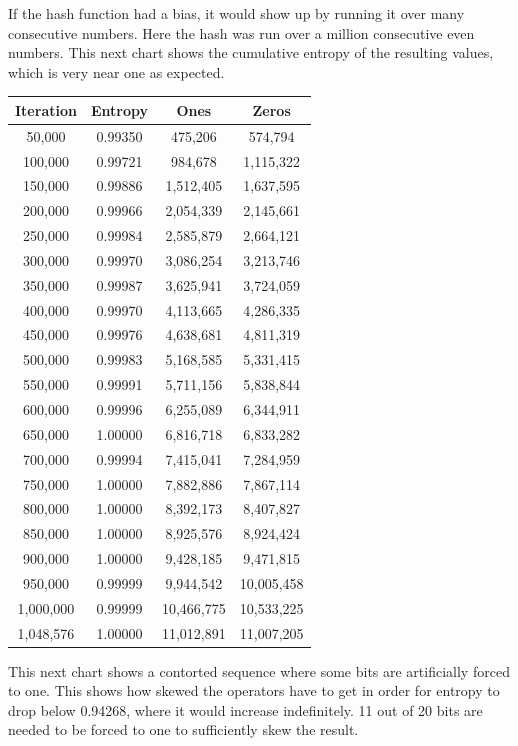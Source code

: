 \documentclass[letterpaper]{article}
\begin{document}
\begin{multicols}{2}
If the hash function had a bias, it would show up by running it over many consecutive numbers. Here the hash was run over a million consecutive even numbers. This next chart shows the cumulative entropy of the resulting values, which is very near one as expected.

\begin{center}
\begin{tabular}{|c|c|c|c|}
\hline
\textbf{Iteration} & \textbf{Entropy} & \textbf{Ones} & \textbf{Zeros} \\
\hline
50,000 & 0.99350 & 475,206 & 574,794 \\
100,000 & 0.99721 & 984,678 & 1,115,322 \\
150,000 & 0.99886 & 1,512,405 & 1,637,595 \\
200,000 & 0.99966 & 2,054,339 & 2,145,661 \\
250,000 & 0.99984 & 2,585,879 & 2,664,121 \\
300,000 & 0.99970 & 3,086,254 & 3,213,746 \\
350,000 & 0.99987 & 3,625,941 & 3,724,059 \\
400,000 & 0.99970 & 4,113,665 & 4,286,335 \\
450,000 & 0.99976 & 4,638,681 & 4,811,319 \\
500,000 & 0.99983 & 5,168,585 & 5,331,415 \\
550,000 & 0.99991 & 5,711,156 & 5,838,844 \\
600,000 & 0.99996 & 6,255,089 & 6,344,911 \\
650,000 & 1.00000 & 6,816,718 & 6,833,282 \\
700,000 & 0.99994 & 7,415,041 & 7,284,959 \\
750,000 & 1.00000 & 7,882,886 & 7,867,114 \\
800,000 & 1.00000 & 8,392,173 & 8,407,827 \\
850,000 & 1.00000 & 8,925,576 & 8,924,424 \\
900,000 & 1.00000 & 9,428,185 & 9,471,815 \\
950,000 & 0.99999 & 9,944,542 & 10,005,458 \\
1,000,000 & 0.99999 & 10,466,775 & 10,533,225 \\
1,048,576 & 1.00000 & 11,012,891 & 11,007,205 \\
\hline
\end{tabular}
\end{center}

This next chart shows a contorted sequence where some bits are artificially forced to one. This shows how skewed the operators have to get in order for entropy to drop below 0.94268, where it would increase indefinitely. 11 out of 20 bits are needed to be forced to one to sufficiently skew the result.


\end{multicols}
\end{document}
